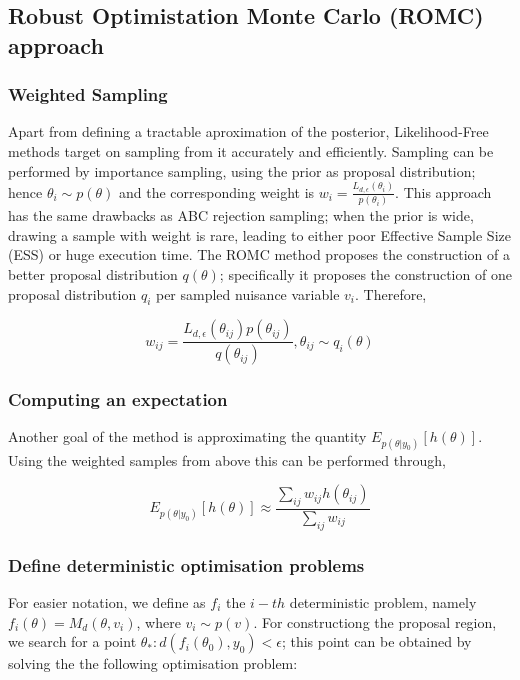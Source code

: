\subsection{Robust Optimistation Monte Carlo (ROMC) approach}
\label{sec:ROMC}

\subsubsection*{Weighted Sampling}

Apart from defining a tractable aproximation of the posterior, Likelihood-Free methods target on sampling from it accurately and efficiently. Sampling can be performed by importance sampling, using the prior as proposal distribution; hence $\theta_i \sim p(\theta)$ and the corresponding weight is $w_i = \frac{L_{d,\epsilon}(\theta_i)}{p(\theta_i)}$. This approach has the same drawbacks as ABC rejection sampling; when the prior is wide, drawing a sample with weight is rare, leading to either poor Effective Sample Size (ESS) or huge execution time. The ROMC method proposes the construction of a better proposal distribution $q(\theta)$; specifically it proposes the construction of one proposal distribution $q_i$ per sampled nuisance variable $v_i$. Therefore,

\begin{equation} \label{eq:sampling}
  w_{ij} = \frac{L_{d,\epsilon}(\theta_{ij}) p(\theta_{ij})}{q(\theta_{ij})}, \theta_{ij} \sim q_i(\theta)
 \end{equation}


\subsubsection*{Computing an expectation}

Another goal of the method is approximating the quantity $E_{p(\theta|y_0)}[h(\theta)]$. Using the weighted samples from above this can be performed through,

\begin{equation} \label{eq:expectation}
  E_{p(\theta|y_0)}[h(\theta)] \approx \frac{\sum_{ij} w_{ij} h(\theta_{ij})}{\sum_{ij} w_{ij}}
 \end{equation}

 
 \subsubsection{Define deterministic optimisation problems}
 
For easier notation, we define as $f_i$ the $i-th$ deterministic problem, namely $f_i(\theta) = M_d(\theta, v_i)$, where $v_i \sim p(v)$. For constructiong the proposal region, we search for a point $\theta_* : d(f_i(\theta_0), y_0) < \epsilon$; this point can be obtained by solving the the following optimisation problem:

